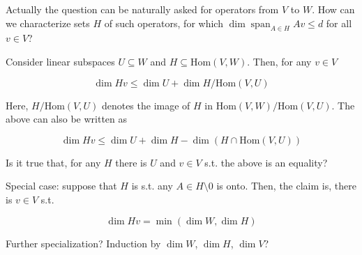 \documentclass[a4paper]{article}
\DeclareMathOperator{\Sp}{span}
\newcommand{\AP}[1]{\left(#1\right)}
\newcommand{\Hom}{\mathrm{Hom}}
\begin{document}
Actually the question can be naturally asked for operators from $V$ to $W$. How can we characterize sets $H$ of such operators, for which $\dim\Sp_{A\in H} Av\leq d$ for all $v\in V$?

Consider linear subspaces $U\subseteq W$ and $H\subseteq \Hom(V,W)$. Then, for any $v\in V$

\[\dim Hv \leq \dim U + \dim H/\Hom(V,U)\]

Here, $H/\Hom(V,U)$ denotes the image of $H$ in $\Hom(V,W)/\Hom(V,U)$. The above can also be written as

\[\dim Hv\leq\dim U+\dim H-\dim\AP{H\cap\Hom(V,U)}\]

Is it true that, for any $H$ there is $U$ and $v\in V$ s.t. the above is an equality?

Special case: suppose that $H$ is s.t. any $A\in H\setminus0$ is onto. Then, the claim is, there is $v\in V$ s.t.

\[\dim Hv = \min(\dim W, \dim H)\]

Further specialization? Induction by $\dim W$, $\dim H$, $\dim V$?
\end{document}
